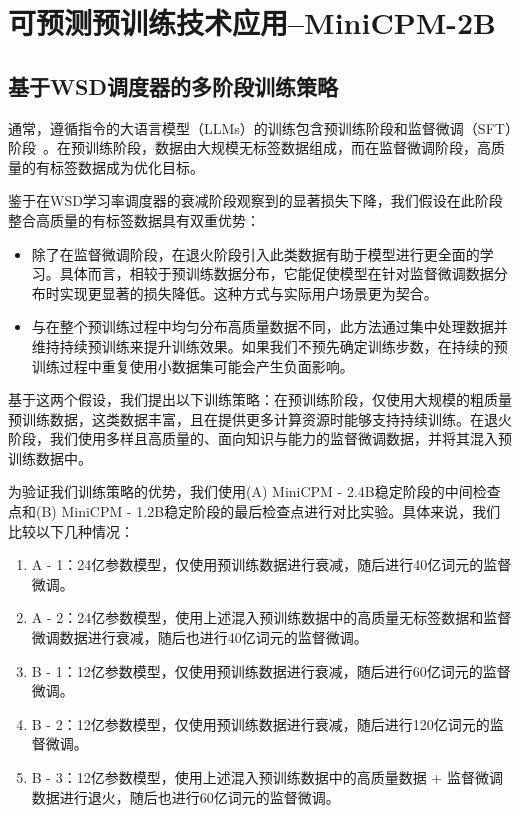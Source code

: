 \chapter{可预测预训练技术应用--MiniCPM-2B}

\section{基于WSD调度器的多阶段训练策略}
\label{sec:trainingstrategy}
通常，遵循指令的大语言模型（LLMs）的训练包含预训练阶段和监督微调（SFT）阶段~\citep{zhang2023instruction,wei2021finetuned}。在预训练阶段，数据由大规模无标签数据组成，而在监督微调阶段，高质量的有标签数据成为优化目标。

鉴于在WSD学习率调度器的衰减阶段观察到的显著损失下降，我们假设在此阶段整合高质量的有标签数据具有双重优势：
\begin{itemize}
    \item 除了在监督微调阶段，在退火阶段引入此类数据有助于模型进行更全面的学习。具体而言，相较于预训练数据分布，它能促使模型在针对监督微调数据分布时实现更显著的损失降低。这种方式与实际用户场景更为契合。
    \item 与在整个预训练过程中均匀分布高质量数据不同，此方法通过集中处理数据并维持持续预训练来提升训练效果。如果我们不预先确定训练步数，在持续的预训练过程中重复使用小数据集可能会产生负面影响。
\end{itemize}

基于这两个假设，我们提出以下训练策略：在预训练阶段，仅使用大规模的粗质量预训练数据，这类数据丰富，且在提供更多计算资源时能够支持持续训练。在退火阶段，我们使用多样且高质量的、面向知识与能力的监督微调数据，并将其混入预训练数据中。

为验证我们训练策略的优势，我们使用(A) MiniCPM - 2.4B稳定阶段的中间检查点和(B) MiniCPM - 1.2B稳定阶段的最后检查点进行对比实验。具体来说，我们比较以下几种情况：

\begin{enumerate}
    \item A - 1：24亿参数模型，仅使用预训练数据进行衰减，随后进行40亿词元的监督微调。
    \item A - 2：24亿参数模型，使用上述混入预训练数据中的高质量无标签数据和监督微调数据进行衰减，随后也进行40亿词元的监督微调。
    \item B - 1：12亿参数模型，仅使用预训练数据进行衰减，随后进行60亿词元的监督微调。
    \item B - 2：12亿参数模型，仅使用预训练数据进行衰减，随后进行120亿词元的监督微调。
    \item B - 3：12亿参数模型，使用上述混入预训练数据中的高质量数据 + 监督微调数据进行退火，随后也进行60亿词元的监督微调。 
\end{enumerate}

